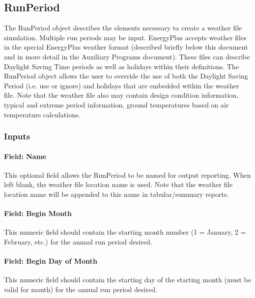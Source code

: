 \subsection{RunPeriod}\label{runperiod}

The RunPeriod object describes the elements necessary to create a weather file simulation. Multiple run periods may be input. EnergyPlus accepts weather files in the special EnergyPlus weather format (described briefly below this document and in more detail in the Auxiliary Programs document). These files can describe Daylight Saving Time periods as well as holidays within their definitions. The RunPeriod object allows the user to override the use of both the Daylight Saving Period (i.e. use or ignore) and holidays that are embedded within the weather file. Note that the weather file also may contain design condition information, typical and extreme period information, ground temperatures based on air temperature calculations.

\subsubsection{Inputs}\label{inputs-4-018}

\paragraph{Field: Name}\label{field-name-4-015}

This optional field allows the RunPeriod to be named for output reporting. When left blank, the weather file location name is used. Note that the weather file location name will be appended to this name in tabular/summary reports.

\paragraph{Field: Begin Month}\label{field-begin-month-1}

This numeric field should contain the starting month number (1 = January, 2 = February, etc.) for the annual run period desired.

\paragraph{Field: Begin Day of Month}\label{field-begin-day-of-month-1}

This numeric field should contain the starting day of the starting month (must be valid for month) for the annual run period desired.

